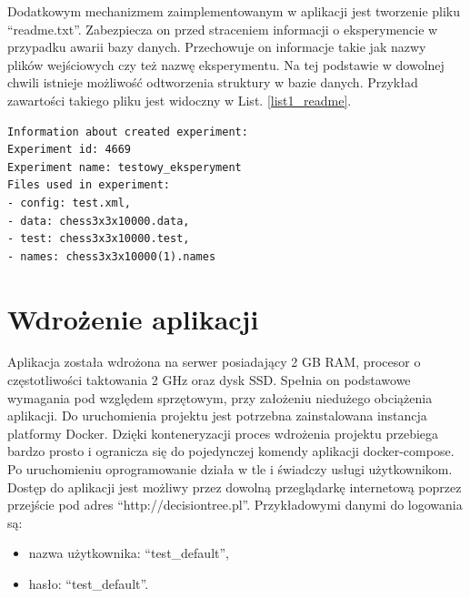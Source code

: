 Dodatkowym mechanizmem zaimplementowanym w aplikacji jest tworzenie pliku \enquote{readme.txt}. Zabezpiecza on przed straceniem informacji o eksperymencie w przypadku awarii bazy danych. Przechowuje on informacje takie jak nazwy plików wejściowych czy też nazwę eksperymentu. Na tej podstawie w dowolnej chwili istnieje możliwość odtworzenia struktury w bazie danych. Przykład zawartości takiego pliku jest widoczny w List. \ref{list1_readme}.

\begin{lstlisting}[numbers=none,frame=single, caption={Przykład zawartości pliku readme },captionpos=b, label=list1_readme]
Information about created experiment: 
Experiment id: 4669
Experiment name: testowy_eksperyment
Files used in experiment: 
- config: test.xml,
- data: chess3x3x10000.data, 
- test: chess3x3x10000.test, 
- names: chess3x3x10000(1).names
\end{lstlisting}


\section{Wdrożenie aplikacji}
Aplikacja została wdrożona na serwer posiadający 2 GB RAM, procesor o częstotliwości taktowania 2 GHz oraz dysk SSD. Spełnia on podstawowe wymagania pod względem sprzętowym, przy założeniu niedużego obciążenia aplikacji. Do uruchomienia projektu jest potrzebna zainstalowana instancja platformy Docker. Dzięki konteneryzacji proces wdrożenia projektu przebiega bardzo prosto i ogranicza się do pojedynczej komendy aplikacji docker-compose. Po uruchomieniu oprogramowanie działa w tle i świadczy usługi użytkownikom. Dostęp do aplikacji jest możliwy przez dowolną przeglądarkę internetową poprzez przejście pod adres \enquote{http://decisiontree.pl}. Przykładowymi danymi do logowania są: 
\begin{itemize}
	\item nazwa użytkownika: \enquote{test\_default},
	\item hasło: \enquote{test\_default}.
\end{itemize} 
